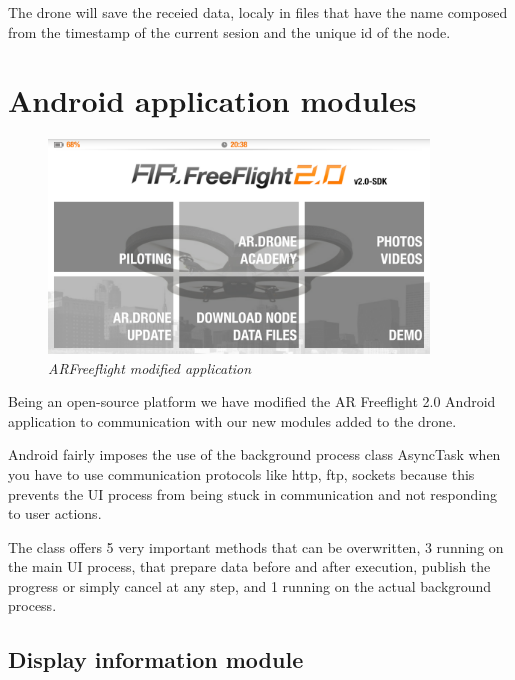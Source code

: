 The drone will save the receied data, localy in files that have the name composed from the timestamp of the current sesion and the unique id of the node.


\section{Android application modules}

\begin{figure}[ht]
\begin{center}
\includegraphics[width=0.9\textwidth]{img/android_app.png}
\end{center}
\caption{\small \itshape{ARFreeflight modified application}}
\end{figure}

Being an open-source platform we have modified the AR Freeflight 2.0 Android application to communication with our new modules added to the drone.

Android fairly imposes the use of the background process class AsyncTask when you have to use communication protocols like http, ftp, sockets because this prevents the UI process from being stuck in communication and not responding to user actions.

The class offers 5 very important methods that can be overwritten, 3 running on the main UI process, that prepare data before and after execution, publish the progress or simply cancel at any step, and 1 running on the actual background process.


\subsection{Display information module}

